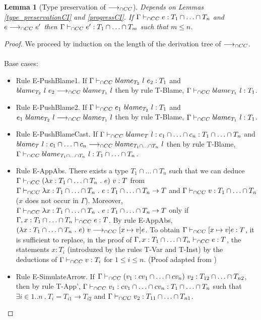 \documentclass[a4paper]{article}
\newtheorem{lemma}{Lemma}[section]
\begin{document}
\begin{lemma}[Type preservation of $\longrightarrow_{\cap CC}$]
\label{type_preservation}
Depends on Lemmas \ref{type_preservationCI} and \ref{progressCI}.
If $\Gamma \vdash_{\cap CC} e : T_1 \cap \ldots \cap T_n$ and $e \longrightarrow_{\cap CC} e'$ then $\Gamma \vdash_{\cap CC} e' : T_1 \cap \ldots \cap T_m$ such that $m \leq n$.
\end{lemma}
\begin{proof}
We proceed by induction on the length of the derivation tree of $\longrightarrow_{\cap CC}$.\\\\
Base cases:
\begin{itemize}
    \item Rule E-PushBlame1.
    If $\Gamma \vdash_{\cap CC} blame_{T_2}\ l\ e_2 : T_1$ and $blame_{T_2}\ l\ e_2 \longrightarrow_{\cap CC} blame_{T_1}\ l$ then by rule T-Blame, $\Gamma \vdash_{\cap CC} blame_{T_1}\ l : T_1$.
    \item Rule E-PushBlame2.
    If $\Gamma \vdash_{\cap CC} e_1\ blame_{T_2}\ l : T_1$ and $e_1\ \blame{T_2}{l} \gios \blame{T_1}{l}$ then by rule T-Blame, $\Gamma \vdash_{\cap CC} blame_{T_1}\ l : T_1$.
    \item Rule E-PushBlameCast.
    If $\Gamma \vdash_{\cap CC} blame_{T}\ l : c_1 \cap \ldots \cap c_n : T_1 \cap \ldots \cap T_n$ and $blame_{T}\ l : c_1 \cap \ldots \cap c_n \longrightarrow_{\cap CC} blame_{T_1 \cap \ldots \cap T_n}\ l$ then by rule T-Blame, $\Gamma \vdash_{\cap CC} blame_{T_1 \cap \ldots \cap T_n}\ l : T_1 \cap \ldots \cap T_n$.
    \item Rule E-AppAbs.
    There exists a type $T_1 \cap \ldots \cap T_n$ such that we can deduce $\Gamma \vdash_{\cap CC} (\lambda x : T_1 \cap \ldots \cap T_n\ .\ e)\ v : T$ from $\Gamma \iccts \lambda x : T_1 \cap \ldots \cap T_n\ .\ e : T_1 \cap \ldots \cap T_n \rightarrow T$ and $\Gamma \vdash_{\cap CC} v : T_1 \cap \ldots \cap T_n$ ($x$ does not occur in $\Gamma$).
    Moreover, $\Gamma \iccts \lambda x : T_1 \cap \ldots \cap T_n\ .\ e : T_1 \cap \ldots \cap T_n \rightarrow T$ only if $\Gamma, x : T_1 \cap \ldots \cap T_n \vdash_{\cap CC} e : T$.
    By rule E-AppAbs, $(\lambda x : T_1 \cap \ldots \cap T_n\ .\ e)\ v \longrightarrow_{\cap CC} [x \mapsto v] e$.
    To obtain $\Gamma \vdash_{\cap CC} [x \mapsto v] e : T$, it is sufficient to replace, in the proof of $\Gamma, x : T_1 \cap \ldots \cap T_n \vdash_{\cap CC} e : T$, the statements $x : T_i$ (introduzed by the rules T-Var and T-Inst) by the deductions of $\Gamma \vdash_{\cap CC} v : T_i$ for $1 \leq i \leq n$.
    (Proof adapted from \cite{coppo1980extension})
    \item Rule E-SimulateArrow.
    If $\Gamma \vdash_{\cap CC} (v_1 : cv_1 \cap \ldots \cap cv_n)\ v_2 : T_{12} \cap \ldots \cap T_{n2}$, then by rule T-App', $\Gamma \vdash_{\cap CC} v_1 : cv_1 \cap \ldots \cap cv_n : T_1 \cap \ldots \cap T_n$ such that $\exists i \in 1 .. n\ .\ T_i = T_{i1} \rightarrow T_{i2}$ and $\Gamma \vdash_{\cap CC} v_2 : T_{11} \cap \ldots \cap T_{n1}$.

\end{itemize}
\end{proof}
\end{document}
